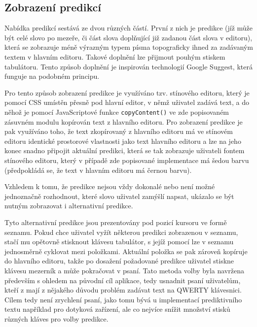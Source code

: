 \documentclass[a4paper,11pt]{article}
\begin{document}
\subsection{Zobrazení predikcí}

Nabídka predikcí sestává ze dvou různých částí. První z nich je predikce (jíž může být celé slovo po mezeře, či část slova doplňující již zadanou část slova v editoru), která se zobrazuje méně výrazným typem písma topograficky ihned za zadávaným textem v hlavním editoru. Takové doplnění lze přijmout pouhým stiskem tabulátoru. Tento způsob doplnění je inspirován technologií Google Suggest, která funguje na podobném principu. 

Pro tento způsob zobrazení predikce je využíváno tzv. stínového editoru, který je pomocí CSS umístěn přesně pod hlavní editor, v němž uživatel zadává text, a do něhož je pomocí JavaScriptové funkce {\tt copyContent()} ve zde popisovaném zásuvném modulu kopírován text z hlavního editoru. Pro zobrazení predikce je pak využíváno toho, že text zkopírovaný z hlavního editoru má ve stínovém editoru identické prostorové vlastnosti jako text hlavního editoru a lze na jeho konec snadno připojit aktuální predikci, která se tak zobrazuje uživateli fontem stínového editoru, který v případě zde popisované implementace má šedou barvu (předpokládá se, že text v hlavním editoru má černou barvu). 

Vzhledem k tomu, že predikce nejsou vždy dokonalé nebo není možné jednoznačně rozhodnout, které slovo uživatel zamýšlí napsat, ukázalo se být nutným zobrazovat i alternativní predikce. 

Tyto alternativní predikce jsou prezentovány pod pozicí kursoru ve formě seznamu. Pokud chce uživatel vyžít některou predikci zobrazenou v seznamu, stačí mu opětovně stisknout klávesu tabulátor, s jejíž pomocí lze v seznamu jednosměrně cyklovat mezi položkami. Aktuální položka se pak zároveň kopíruje do hlavního editoru, takže po dosažení požadované predikce uživatel stiskne klávesu mezerník a může pokračovat v psaní. Tato metoda volby byla navržena především s ohledem na původní cíl aplikace, tedy usnadnit psaní uživatelům, kteří z mají z nějakého důvodu problém zadávat text na QWERTY klávesnici. Cílem tedy není zrychlení psaní, jako tomu bývá u implementací prediktivního textu například pro dotyková zařízení, ale co nejvíce snížit množství stisků různých kláves pro volby predikce.
\end{document}
